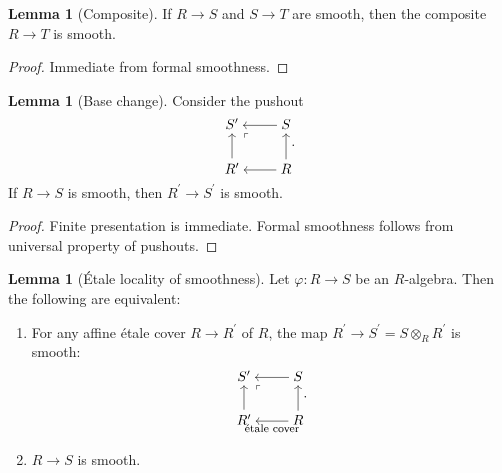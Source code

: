 \documentclass[letterpaper,10pt,twoside]{amsart}
\newcommand{\tens}{\otimes}
\theoremstyle{proposition}
\theoremstyle{definition}
\theoremstyle{theorem}
\theoremstyle{definition}
\theoremstyle{definition}
\theoremstyle{definition}
\theoremstyle{lemma}
\newtheorem{lemma}[proposition]{\textbf{Lemma}}
\theoremstyle{definition}
\theoremstyle{definition}
\theoremstyle{corollary}
\theoremstyle{definition}
\begin{document}
	
	\begin{lemma}[Composite]\label{L-Smooth stable under composites}
		If $R\to S$ and $S\to T$ are smooth, then the composite $R\to T$ is smooth.
	\end{lemma}
	\begin{proof}
		Immediate from formal smoothness.
	\end{proof} 
	\begin{lemma}[Base change]\label{L-Base change for smooth}
		Consider the pushout 
		\[\begin{tikzcd}[cramped]
			{S^\prime} & S \\
			{R^\prime} & R
			\arrow["\ulcorner"{anchor=center, pos=0.125}, draw=none, from=1-1, to=2-2]
			\arrow[from=1-2, to=1-1]
			\arrow[from=2-1, to=1-1]
			\arrow[from=2-2, to=1-2]
			\arrow[from=2-2, to=2-1]
		\end{tikzcd}.\]
		If $R\to S$ is smooth, then $R^{\prime}\to S^{\prime}$ is smooth.
	\end{lemma}
	\begin{proof}
		Finite presentation is immediate. Formal smoothness follows from universal property of pushouts.
	\end{proof}
	\begin{lemma}[\'Etale locality of smoothness]
		Let $\varphi : R\to S$ be an $R$-algebra. Then the following are equivalent:
		\begin{enumerate}
			\item {For any affine \'etale cover $R\to R^{\prime}$ of $R$, the map $R^{\prime} \to S^{\prime} = S\tens_{R}R^{\prime}$ is smooth:
			\[\begin{tikzcd}[cramped]
				{S^\prime} & S \\
				{R^\prime} & R
				\arrow["\ulcorner"{anchor=center, pos=0.125}, draw=none, from=1-1, to=2-2]
				\arrow[from=1-2, to=1-1]
				\arrow[from=2-1, to=1-1]
				\arrow[from=2-2, to=1-2]
				\arrow["{\text{\footnotesize \'etale cover}}", from=2-2, to=2-1]
			\end{tikzcd}.\]
			}
			\item {$R\to S$ is smooth.}
		\end{enumerate}
	\end{lemma}
\end{document}
